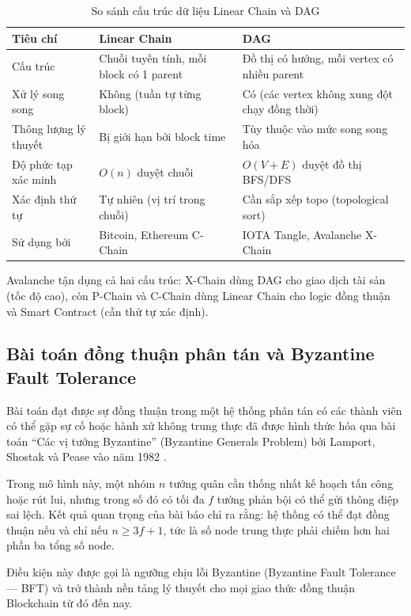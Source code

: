 \begin{table}[H]
\centering
\caption{So sánh cấu trúc dữ liệu Linear Chain và DAG}
\label{tab:chain_vs_dag}
\begin{tabular}{|l|p{5cm}|p{5.5cm}|}
\hline
\textbf{Tiêu chí} & \textbf{Linear Chain} & \textbf{DAG} \\ \hline
Cấu trúc & Chuỗi tuyến tính, mỗi block có 1 parent & Đồ thị có hướng, mỗi vertex có nhiều parent \\ \hline
Xử lý song song & Không (tuần tự từng block) & Có (các vertex không xung đột chạy đồng thời) \\ \hline
Thông lượng lý thuyết & Bị giới hạn bởi block time & Tùy thuộc vào mức song song hóa \\ \hline
Độ phức tạp xác minh & $O(n)$ duyệt chuỗi & $O(V + E)$ duyệt đồ thị BFS/DFS \\ \hline
Xác định thứ tự & Tự nhiên (vị trí trong chuỗi) & Cần sắp xếp topo (topological sort) \\ \hline
Sử dụng bởi & Bitcoin, Ethereum C-Chain & IOTA Tangle, Avalanche X-Chain \\ \hline
\end{tabular}
\end{table}

Avalanche tận dụng cả hai cấu trúc: X-Chain dùng DAG cho giao dịch tài sản (tốc độ cao), còn P-Chain và C-Chain dùng Linear Chain cho logic đồng thuận và Smart Contract (cần thứ tự xác định).

\subsection{Bài toán đồng thuận phân tán và Byzantine Fault Tolerance}

Bài toán đạt được sự đồng thuận trong một hệ thống phân tán có các thành viên có thể gặp sự cố hoặc hành xử không trung thực đã được hình thức hóa qua bài toán ``Các vị tướng Byzantine'' (Byzantine Generals Problem) bởi Lamport, Shostak và Pease vào năm 1982 \cite{lamport1982byzantine}.

Trong mô hình này, một nhóm $n$ tướng quân cần thống nhất kế hoạch tấn công hoặc rút lui, nhưng trong số đó có tối đa $f$ tướng phản bội có thể gửi thông điệp sai lệch. Kết quả quan trọng của bài báo chỉ ra rằng: hệ thống có thể đạt đồng thuận nếu và chỉ nếu $n \geq 3f + 1$, tức là số node trung thực phải chiếm hơn hai phần ba tổng số node.

Điều kiện này được gọi là ngưỡng chịu lỗi Byzantine (Byzantine Fault Tolerance --- BFT) và trở thành nền tảng lý thuyết cho mọi giao thức đồng thuận Blockchain từ đó đến nay.

